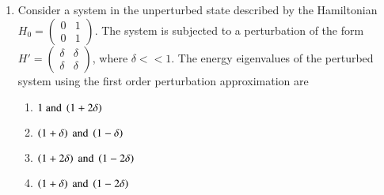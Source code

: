 \documentclass[journal]{IEEEtran}
\begin{document}
\begin{enumerate}[start=14]
    \item Consider a system in the unperturbed state described by the Hamiltonian $H_0 = \begin{pmatrix} 0 & 1 \\ 0 & 1 \end{pmatrix}$. The system is subjected to a perturbation of the form $H' = \begin{pmatrix} \delta & \delta \\ \delta & \delta \end{pmatrix}$, where $\delta << 1$. The energy eigenvalues of the perturbed system using the first order perturbation approximation are 
    \begin{multicols}{2}
        \begin{enumerate}
            \item $1 \text{ and } \left(1+2\delta\right)$
            \item $\left(1+\delta\right) \text{ and } \left(1-\delta\right)$
            \item $\left(1+2\delta\right) \text{ and } \left(1-2\delta\right)$
            \item $\left(1+\delta\right) \text{ and } \left(1-2\delta\right)$
        \end{enumerate}
    \end{multicols}
\end{enumerate}
\end{document}
